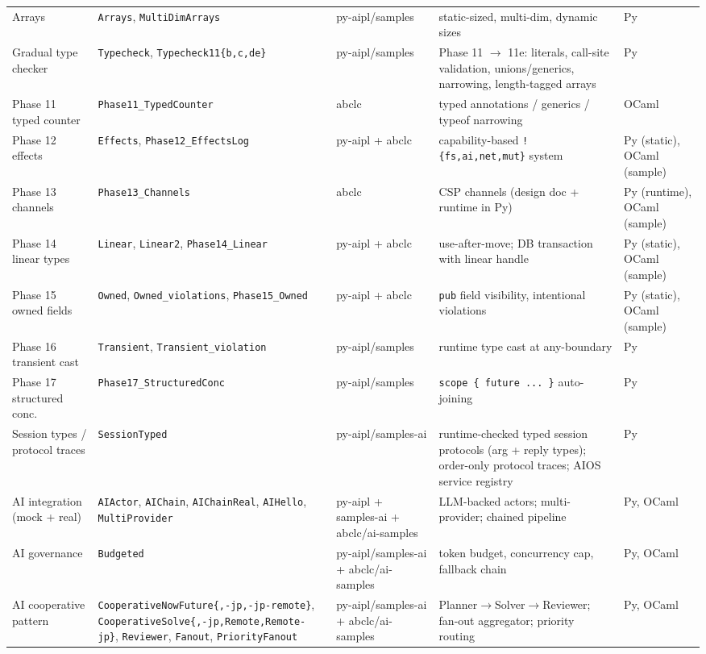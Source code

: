 \documentclass[10pt,a4paper,landscape]{article}
\begin{document}
\begin{longtable}{p{3.0cm} p{5.5cm} p{2.8cm} p{6.4cm} p{4.0cm}}
  Arrays & \texttt{Arrays}, \texttt{MultiDimArrays} & py-aipl/samples & static-sized, multi-dim, dynamic sizes & Py \\
  Gradual type checker & \texttt{Typecheck}, \texttt{Typecheck11\{b,c,de\}} & py-aipl/samples & Phase 11 $\to$ 11e: literals, call-site validation, unions/generics, narrowing, length-tagged arrays & Py \\
  Phase 11 typed counter & \texttt{Phase11\_TypedCounter} & abclc & typed annotations / generics / typeof narrowing & OCaml \\
  Phase 12 effects & \texttt{Effects}, \texttt{Phase12\_EffectsLog} & py-aipl + abclc & capability-based \texttt{!\{fs,ai,net,mut\}} system & Py (static), OCaml (sample) \\
  Phase 13 channels & \texttt{Phase13\_Channels} & abclc & CSP channels (design doc + runtime in Py) & Py (runtime), OCaml (sample) \\
  Phase 14 linear types & \texttt{Linear}, \texttt{Linear2}, \texttt{Phase14\_Linear} & py-aipl + abclc & use-after-move; DB transaction with linear handle & Py (static), OCaml (sample) \\
  Phase 15 owned fields & \texttt{Owned}, \texttt{Owned\_violations}, \texttt{Phase15\_Owned} & py-aipl + abclc & \texttt{pub} field visibility, intentional violations & Py (static), OCaml (sample) \\
  Phase 16 transient cast & \texttt{Transient}, \texttt{Transient\_violation} & py-aipl/samples & runtime type cast at any-boundary & Py \\
  Phase 17 structured conc. & \texttt{Phase17\_StructuredConc} & py-aipl/samples & \texttt{scope \{ future ... \}} auto-joining & Py \\
  Session types / protocol traces & \texttt{SessionTyped} & py-aipl/samples-ai & runtime-checked typed session protocols (arg + reply types); order-only protocol traces; AIOS service registry & Py \\
  AI integration (mock + real) & \texttt{AIActor}, \texttt{AIChain}, \texttt{AIChainReal}, \texttt{AIHello}, \texttt{MultiProvider} & py-aipl + samples-ai + abclc/ai-samples & LLM-backed actors; multi-provider; chained pipeline & Py, OCaml \\
  AI governance & \texttt{Budgeted} & py-aipl/samples-ai + abclc/ai-samples & token budget, concurrency cap, fallback chain & Py, OCaml \\
  AI cooperative pattern & \texttt{CooperativeNowFuture\{,-jp,-jp-remote\}}, \texttt{CooperativeSolve\{,-jp,Remote,Remote-jp\}}, \texttt{Reviewer}, \texttt{Fanout}, \texttt{PriorityFanout} & py-aipl/samples-ai + abclc/ai-samples & Planner$\to$Solver$\to$Reviewer; fan-out aggregator; priority routing & Py, OCaml \\

\end{longtable}
\end{document}
